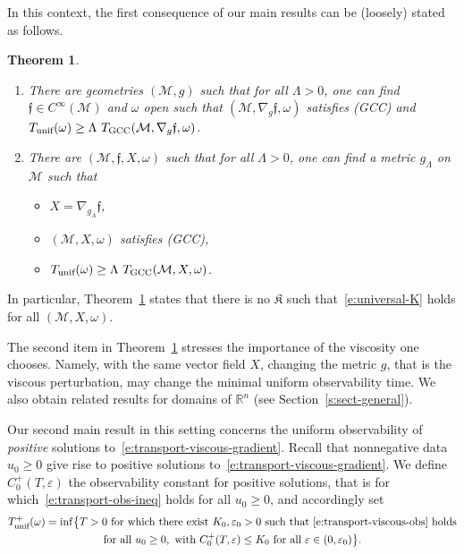 \documentclass[JEP,XML,SOM,Unicode]{cedram}
\newcommand{\GCC}{\textup{GCC}}
\newcommand{\pGCC}{\textup{(GCC)}\xspace}
\newcommand{\unif}{\textup{unif}}
\newtheorem{theorem}[lemma]{Theorem}
\theoremstyle{definition}
\newcommand{\M}{\ensuremath{\mathcal M}}
\newcommand{\mb}[1]{\ensuremath{\mathbb{#1}}}
\newcommand{\R}{{\mb{R}}}
\newcommand{\f}{\ensuremath{\mathfrak{f}}}
\newcommand\nablag{\nabla_{g}}
\let\eps\varepsilon
\begin{document}
In this context, the first consequence of our main results can be (loosely) stated as follows.

\skpt
\begin{theorem}
\label{t:loose}
\begin{enumerate}
\item There are geometries $(\M,g)$ such that for all $\Lambda>0$, one can find $\f \in C^\infty(\M)$ and $\omega$ open such that $(\M, \nablag \f, \omega)$ satisfies \pGCC and $T_{\unif}(\omega) \geq \Lambda \ T_{\GCC}(\M, \nablag \f, \omega)$.
\item There are $(\M,\f, X,\omega)$ such that for all $\Lambda>0$, one can find a metric $g_\Lambda$ on $\M$ such that
\begin{itemize}
\item $X = \nabla_{g_\Lambda}\f$,
\item $(\M, X, \omega)$ satisfies \pGCC,
\item $T_{\unif}(\omega) \geq \Lambda \ T_{\GCC}(\M, X, \omega)$.
\end{itemize}
\end{enumerate}
\end{theorem}
In particular, Theorem~\ref{t:loose} states that there is no $\mathfrak{K}$ such that~\eqref{e:universal-K} holds for all $(\M,X,\omega)$.

The second item in Theorem~\ref{t:loose} stresses the importance of the viscosity one chooses. Namely, with the same vector field $X$, changing the metric $g$, that is the viscous perturbation, may change the minimal uniform observability time.
We also obtain related results for domains of $\R^{n}$ (see Section~\ref{s:sect-general}).

Our second main result in this setting concerns the uniform observability of {\em positive} solutions to~\eqref{e:transport-viscous-gradient}. Recall that nonnegative data $u_0\geq 0$ give rise to positive solutions to~\eqref{e:transport-viscous-gradient}. We define $C_0^+(T,\eps)$ the observability constant for positive solutions, that is for which~\eqref{e:transport-obs-ineq} holds for all $u_0\geq0$, and accordingly set
\begin{multline}
\label{defTunif+}
T_{\unif}^+(\omega) = \inf \bigl\{ T >0 \text{ for which there exist }K_0, \eps_0>0 \text{ such that~\eqref{e:transport-viscous-obs} holds}\\
\text{for all }u_0\geq 0, \text{ with }C_0^+(T,\eps)\leq K_0 \text{ for all } \eps \in (0,\eps_0) \bigr\}.
\end{multline}
\end{document}
